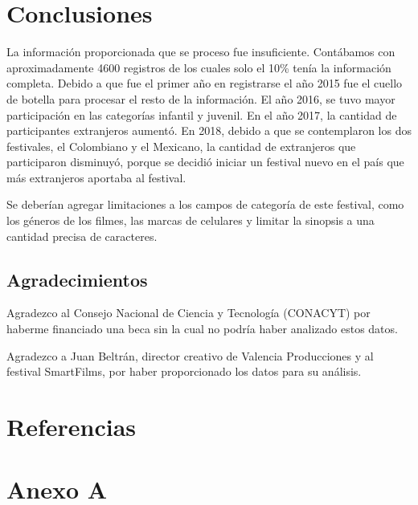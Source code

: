 \documentclass[5p,times]{elsarticle}
\begin{document}
\section*{Conclusiones}
La información proporcionada que se proceso fue insuficiente. Contábamos con aproximadamente 4600 registros de los cuales solo el 10\% tenía la información completa. Debido a que fue el primer año en registrarse el año 2015 fue el cuello de botella para procesar el resto de la información. El año 2016, se tuvo mayor participación en las categorías infantil y juvenil. En el año 2017, la cantidad de participantes extranjeros aumentó. En 2018, debido a que se contemplaron los dos festivales, el Colombiano y el Mexicano, la cantidad de extranjeros que participaron disminuyó, porque se decidió iniciar un festival nuevo en el país que más extranjeros aportaba al festival.

Se deberían agregar limitaciones a los campos de categoría de este festival, como los géneros de los filmes, las marcas de celulares y limitar la sinopsis a una cantidad precisa de caracteres. 


\subsection*{Agradecimientos}
Agradezco al Consejo Nacional de Ciencia y Tecnología (CONACYT) por haberme financiado una beca sin la cual no podría haber analizado estos datos.

Agradezco a Juan Beltrán, director creativo de Valencia Producciones y al festival SmartFilms, por haber proporcionado los datos para su análisis.

\section*{Referencias}





\section*{Anexo A} \label{AnexoA}
\end{document}
